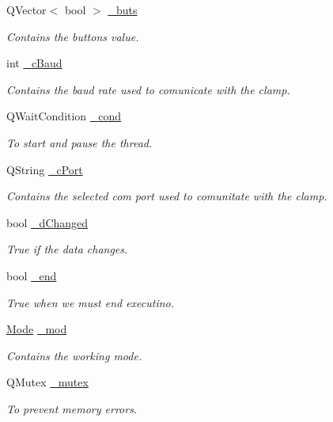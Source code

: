 \begin{DoxyCompactItemize}
Q\+Vector$<$ bool $>$ \hyperlink{a00007_a6f956f7e0f2953e213ff95fb64857ab0}{\+\_\+buts}
\begin{DoxyCompactList}\small\item\em Contains the buttons value. \end{DoxyCompactList}\item 
int \hyperlink{a00007_a9fccfd415e2e55c8abef7fcc6535af30}{\+\_\+c\+Baud}
\begin{DoxyCompactList}\small\item\em Contains the baud rate used to comunicate with the clamp. \end{DoxyCompactList}\item 
Q\+Wait\+Condition \hyperlink{a00007_afcb93c09acd7fecf47d92996a297365c}{\+\_\+cond}
\begin{DoxyCompactList}\small\item\em To start and pause the thread. \end{DoxyCompactList}\item 
Q\+String \hyperlink{a00007_ab52437b31a433c427a6c050f2b1cc959}{\+\_\+c\+Port}
\begin{DoxyCompactList}\small\item\em Contains the selected com port used to comunitate with the clamp. \end{DoxyCompactList}\item 
bool \hyperlink{a00007_a2b6ccfeacbb3cc9ac5c34549b9aa3f11}{\+\_\+d\+Changed}
\begin{DoxyCompactList}\small\item\em True if the data changes. \end{DoxyCompactList}\item 
bool \hyperlink{a00007_acca9896d1a2d1ef68527e6834f81c76c}{\+\_\+end}
\begin{DoxyCompactList}\small\item\em True when we must end executino. \end{DoxyCompactList}\item 
\hyperlink{a00007_a8d581034e60792a9995d44065f6140a5}{Mode} \hyperlink{a00007_acdecea1688594d3ab7386a6db97dd90d}{\+\_\+mod}
\begin{DoxyCompactList}\small\item\em Contains the working mode. \end{DoxyCompactList}\item 
Q\+Mutex \hyperlink{a00007_a6327eafc0dac189ec1b202d63ef32457}{\+\_\+mutex}
\begin{DoxyCompactList}\small\item\em To prevent memory errors. \end{DoxyCompactList}\item 

\end{DoxyCompactItemize}
